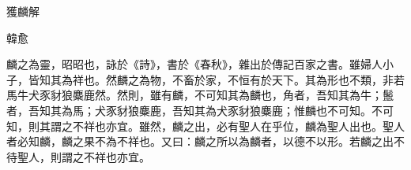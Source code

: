 獲麟解

韓愈

麟之為靈，昭昭也，詠於《詩》，書於《春秋》，雜出於傳記百家之書。雖婦人小子，皆知其為祥也。然麟之為物，不畜於家，不恒有於天下。其為形也不類，非若馬牛犬豕豺狼麋鹿然。然則，雖有麟，不可知其為麟也，角者，吾知其為牛；鬛者，吾知其為馬；犬豕豺狼麋鹿，吾知其為犬豕豺狼麋鹿；惟麟也不可知。不可知，則其謂之不祥也亦宜。雖然，麟之出，必有聖人在乎位，麟為聖人出也。聖人者必知麟，麟之果不為不祥也。又曰：麟之所以為麟者，以德不以形。若麟之出不待聖人，則謂之不祥也亦宜。